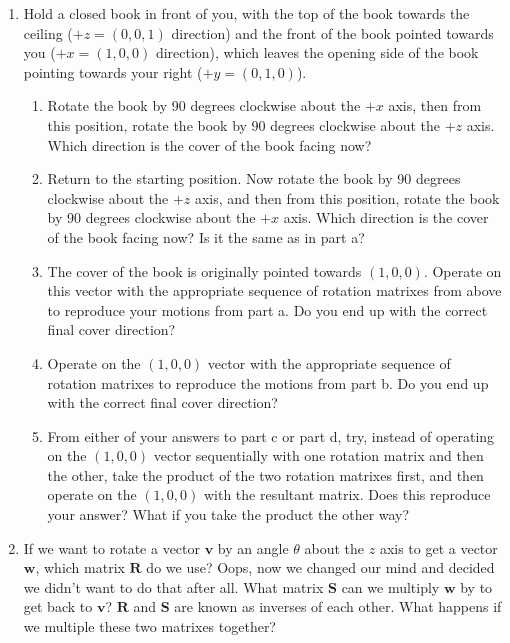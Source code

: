 \documentclass{tufte-handout}
\begin{document}
\begin{enumerate}[resume]
\item  Hold a closed book in front of you, with the top of the book towards the ceiling ($+z = (0,0,1)$ direction) and the front of the book pointed towards you ($+x = (1,0,0)$ direction), which leaves the opening side of the book pointing towards your right ($+y = (0,1,0)$).
    \begin{enumerate}
    \item  Rotate the book by 90 degrees clockwise about the $+x$ axis, then from this position, rotate the book by 90 degrees clockwise about the $+z$ axis.  Which direction is the cover of the book facing now?
    \item  Return to the starting position.  Now rotate the book by 90 degrees clockwise about the $+z$ axis, and then from this position, rotate the book by 90 degrees clockwise about the $+x$ axis.  Which direction is the cover of the book facing now?  Is it the same as in part a?
    \item  The cover of the book is originally pointed towards $(1,0,0)$.  Operate on this vector with the appropriate sequence of rotation matrixes from above to reproduce your motions from part a.  Do you end up with the correct final cover direction?
    \item  Operate on the $(1,0,0)$ vector with the appropriate sequence of rotation matrixes to reproduce the motions from part b.  Do you end up with the correct final cover direction?
    \item  From either of your answers to part c or part d, try, instead of operating on the $(1,0,0)$ vector sequentially with one rotation matrix and then the other, take the product of the two rotation matrixes first, and then operate on the $(1,0,0)$ with the resultant matrix.  Does this reproduce your answer?  What if you take the product the other way?
    \end{enumerate}
\item  If we want to rotate a vector $\mathbf{v}$ by an angle $\theta$ about the $z$ axis to get a vector $\mathbf{w}$, which matrix $\mathbf{R}$ do we use? Oops, now we changed our mind and decided we didn't want to do that after all.  What matrix $\mathbf{S}$ can we multiply $\mathbf{w}$ by to get back to $\mathbf{v}$?  $\mathbf{R}$ and $\mathbf{S}$ are known as inverses of each other.  What happens if we multiple these two matrixes together?
\end{enumerate}
\end{document}
